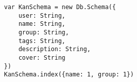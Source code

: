 

\lstset{language=C}

\begin{lstlisting}[frame=single]
var KanSchema = new Db.Schema({
	user: String,
	name: String,
	group: String,
	tags: String,
	description: String,
	cover: String
})
KanSchema.index({name: 1, group: 1})
\end{lstlisting}